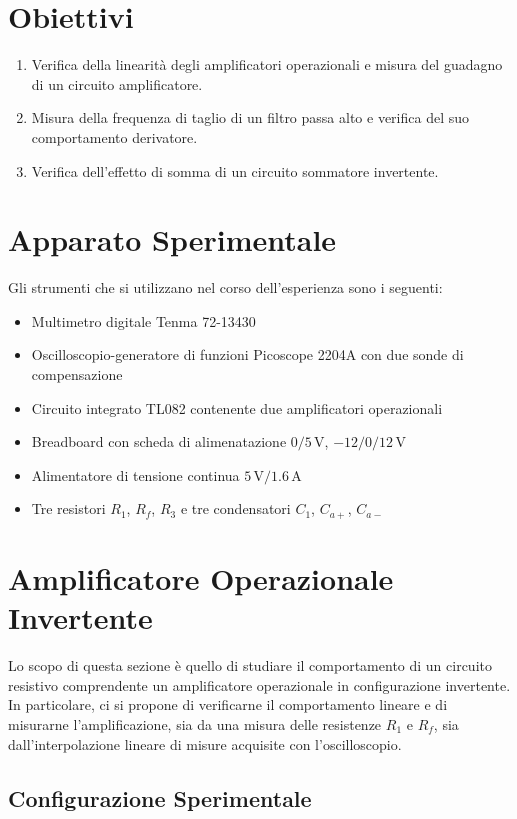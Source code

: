 \documentclass[a4paper,11pt]{article}
\begin{document}
\section{Obiettivi}
\begin{enumerate}
	\item Verifica della linearità degli amplificatori operazionali e misura del guadagno di un circuito amplificatore.
	\item Misura della frequenza di taglio di un filtro passa alto e verifica del suo comportamento derivatore.
	\item Verifica dell'effetto di somma di un circuito sommatore invertente.
\end{enumerate}

\section{Apparato Sperimentale}
Gli strumenti che si utilizzano nel corso dell'esperienza sono i seguenti:
\begin{itemize}
	\item Multimetro digitale Tenma 72-13430
  	\item Oscilloscopio-generatore di funzioni Picoscope 2204A con due sonde di compensazione
	\item Circuito integrato TL082 contenente due amplificatori operazionali
	\item Breadboard con scheda di alimenatazione $0/5\,\si{\volt}$, $-12/0/12\, \si{\volt}$
	\item Alimentatore di tensione continua $5\,\si{\volt}/1.6\,\si\ampere$
	\item Tre resistori $R_1$, $R_f$, $R_3$ e tre condensatori $C_1$, $C_{a+}$, $C_{a-}$
\end{itemize}

\section{Amplificatore Operazionale Invertente}
Lo scopo di questa sezione è quello di studiare il comportamento di un circuito resistivo comprendente un amplificatore operazionale in configurazione invertente. In particolare, ci si propone di verificarne il comportamento lineare e di misurarne l'amplificazione, sia da una misura delle resistenze $R_1$ e $R_f$, sia dall'interpolazione lineare di misure acquisite con l'oscilloscopio.

\subsection{Configurazione Sperimentale}
\end{document}

